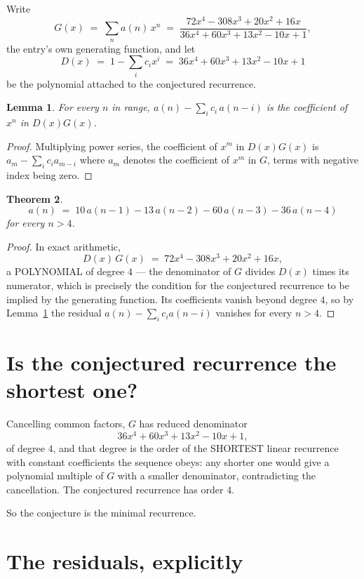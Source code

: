 \documentclass[11pt,a4paper]{article}
\theoremstyle{plain}
\newtheorem{theorem}{Theorem}
\newtheorem{lemma}[theorem]{Lemma}
\theoremstyle{definition}
\begin{document}
Write
\[
G(x)\;=\;\sum_{n}a(n)\,x^{n}\;=\;\frac{72 x^{4} - 308 x^{3} + 20 x^{2} + 16 x}{36 x^{4} + 60 x^{3} + 13 x^{2} - 10 x + 1},
\]
the entry's own generating function, and let
\[
D(x)\;=\;1-\sum_i c_i x^{i}\;=\;36 x^{4} + 60 x^{3} + 13 x^{2} - 10 x + 1
\]
be the polynomial attached to the conjectured recurrence.

\begin{lemma}\label{lem:key}
For every $n$ in range, $a(n)-\sum_i c_i\,a(n-i)$ is the coefficient of $x^{n}$ in
$D(x)G(x)$.
\end{lemma}

\begin{proof}
Multiplying power series, the coefficient of $x^{m}$ in $D(x)G(x)$ is
$a_m-\sum_i c_i a_{m-i}$ where $a_m$ denotes the coefficient of $x^{m}$ in $G$, terms with
negative index being zero.
\end{proof}

\begin{theorem}
\[
a(n)\;=\;10\,a(n-1) - 13\,a(n-2) - 60\,a(n-3) - 36\,a(n-4)
\]
for every $n>4$.
\end{theorem}

\begin{proof}
In exact arithmetic,
\[
D(x)\,G(x)\;=\;72 x^{4} - 308 x^{3} + 20 x^{2} + 16 x,
\]
a POLYNOMIAL of degree $4$ --- the denominator of $G$ divides $D(x)$ times its numerator,
which is precisely the condition for the conjectured recurrence to be implied by the
generating function. Its coefficients vanish beyond degree $4$, so by
Lemma~\ref{lem:key} the residual $a(n)-\sum_ic_ia(n-i)$ vanishes for every
$n>4$.
\end{proof}

\section{Is the conjectured recurrence the shortest one?}

Cancelling common factors, $G$ has reduced denominator
\[
36 x^{4} + 60 x^{3} + 13 x^{2} - 10 x + 1,
\]
of degree $4$, and that degree is the order of the SHORTEST linear recurrence with
constant coefficients the sequence obeys: any shorter one would give a polynomial multiple of
$G$ with a smaller denominator, contradicting the cancellation. The conjectured recurrence has
order $4$.

So the conjecture is the minimal recurrence.

\section{The residuals, explicitly}
\end{document}
